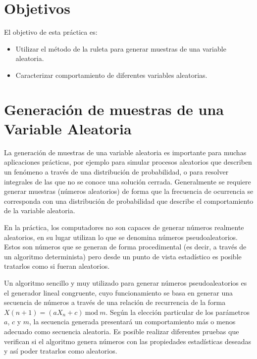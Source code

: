\documentclass[10pt,twoside,spanish,a4paper]{article}
\begin{document}
\vspace{-8em}

\section*{Objetivos}

El objetivo de esta práctica es:
\begin{itemize}
	\item Utilizar el método de la ruleta para generar muestras de una variable aleatoria. 
	\item Caracterizar comportamiento de diferentes variables aleatorias. 
\end{itemize}

\section*{Generación de muestras de una Variable Aleatoria}
La generación de muestras de una variable aleatoria es importante para muchas aplicaciones prácticas, por ejemplo para simular procesos aleatorios que describen un fenómeno a través de una distribución de probabilidad,
o para resolver integrales de las que no se conoce una solución cerrada. %
Generalmente se requiere generar muestras (números aleatorios) de forma que la frecuencia de ocurrencia se corresponda con 
una distribución de probabilidad que describe el comportamiento de la variable aleatoria. 

En la práctica, los computadores no son capaces de generar números realmente aleatorios, en su lugar utilizan lo que se denomina números pseudoaleatorios.
Estos son números que se generan de forma procedimental (es decir, a través de un algoritmo determinista) pero desde un punto de vista estadístico
es posible tratarlos como si fueran aleatorios. 

Un algoritmo sencillo y muy utilizado para generar números pseudoaleatorios es el generador lineal congruente, cuyo funcionamiento se basa 
en generar una secuencia de números a través de una relación de recurrencia de la forma $X(n+1)=(a X_n + c)~\textrm{mod}~m$. Según la elección particular
de los parámetros $a$, $c$ y $m$, la secuencia generada presentará un comportamiento más o menos adecuado como secuencia aleatoria. Es posible
realizar diferentes pruebas que verifican si el algoritmo genera números con las propiedades estadísticas deseadas y así poder tratarlos como 
aleatorios.

\newpage
\end{document}
